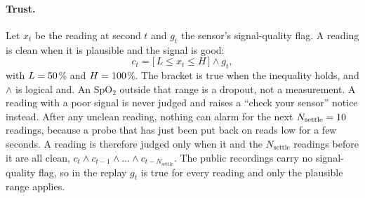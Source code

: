 \paragraph{Trust.}
Let $x_t$ be the reading at second $t$ and $g_t$ the sensor's signal-quality flag. A reading is clean when it is plausible and the signal is good:
\begin{equation}\label{eq:clean}
  c_t = \bigl[\, L \le x_t \le H \,\bigr] \wedge g_t ,
\end{equation}
with $L = 50$\% and $H = 100$\%. The bracket is true when the inequality holds, and $\wedge$ is logical and. An SpO$_2$ outside that range is a dropout, not a measurement. A reading with a poor signal is never judged and raises a ``check your sensor'' notice instead. After any unclean reading, nothing can alarm for the next $N_\text{settle} = 10$ readings, because a probe that has just been put back on reads low for a few seconds. A reading is therefore judged only when it and the $N_\text{settle}$ readings before it are all clean, $c_t \wedge c_{t-1} \wedge \dots \wedge c_{t-N_\text{settle}}$. The public recordings carry no signal-quality flag, so in the replay $g_t$ is true for every reading and only the plausible range applies.

